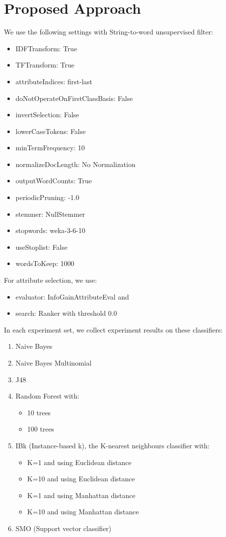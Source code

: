\documentclass[conference]{IEEEtran}
\begin{document}
\section{Proposed Approach}
We use the following settings with String-to-word unsupervised filter:
\begin{itemize}
\item IDFTransform: True
\item TFTransform: True
\item attributeIndices: first-last
\item doNotOperateOnFirstClassBasis: False
\item invertSelection: False
\item lowerCaseTokens: False
\item minTermFrequency: 10
\item normalizeDocLength: No Normalization
\item outputWordCounts: True
\item periodicPruning: -1.0
\item stemmer: NullStemmer
\item stopwords: weka-3-6-10
\item useStoplist: False
\item wordsToKeep: 1000
\end{itemize}


For attribute selection, we use:
\begin{itemize}
\item evaluator: InfoGainAttributeEval and
\item search: Ranker with threshold 0.0
\end{itemize}

In each experiment set, we collect experiment results on these classifiers:
\begin{enumerate}
\item Naive Bayes
\item  Naive Bayes Multinomial
\item J48
\item Random Forest with:
    \begin{itemize}
    \item 10 trees
    \item 100 trees
    \end{itemize}
\item IBk (Instance-based k), the K-nearest neighbours classifier with:
    \begin{itemize}
    \item K=1 and using Euclidean distance
    \item K=10 and using Euclidean distance
    \item K=1 and using Manhattan distance
    \item K=10 and using Manhattan distance
    \end{itemize}
\item SMO (Support vector classifier)
\end{enumerate}
\end{document}

